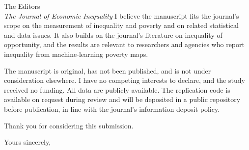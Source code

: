 \documentclass[10pt,a4paper]{letter}
\begin{document}
\begin{letter}{The Editors\\
\textit{The Journal of Economic Inequality}}
I believe the manuscript fits the journal's scope on the measurement of inequality and poverty and on related statistical and data issues. It also builds on the journal's literature on inequality of opportunity, and the results are relevant to researchers and agencies who report inequality from machine-learning poverty maps.

The manuscript is original, has not been published, and is not under consideration elsewhere. I have no competing interests to declare, and the study received no funding. All data are publicly available. The replication code is available on request during review and will be deposited in a public repository before publication, in line with the journal's information deposit policy.

Thank you for considering this submission.

\closing{Yours sincerely,}

\end{letter}
\end{document}
